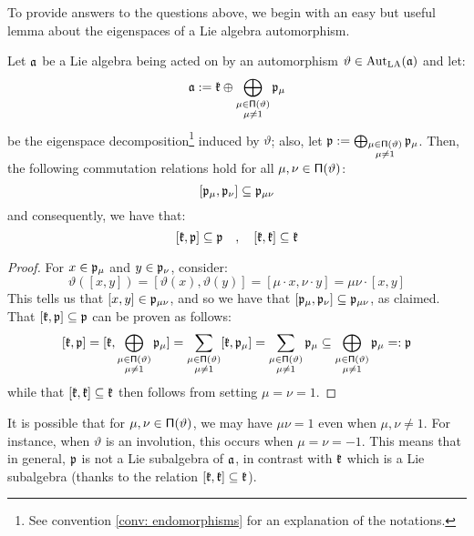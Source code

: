         To provide answers to the questions above, we begin with an easy but useful lemma about the eigenspaces of a Lie algebra automorphism.
        \begin{lemma} \label{lemma: symmetric_space_decompositions}
            Let $\mathfrak{a}$ be a Lie algebra being acted on by an automorphism $\vartheta \in \operatorname{Aut}_{\mathrm{LA}}(\mathfrak{a})$ and let:
                $$\mathfrak{a} := \mathfrak{k} \oplus \bigoplus_{ \substack{\mu \in \mathsf{\Pi}(\vartheta) \\ \mu \not = 1} } \mathfrak{p}_{\mu}$$
            be the eigenspace decomposition\footnote{See convention \ref{conv: endomorphisms} for an explanation of the notations.} induced by $\vartheta$; also, let $\mathfrak{p} := \bigoplus_{ \substack{\mu \in \mathsf{\Pi}(\vartheta) \\ \mu \not = 1} } \mathfrak{p}_{\mu}$. Then, the following commutation relations hold for all $\mu, \nu \in \mathsf{\Pi}(\vartheta)$:
                \begin{equation} \label{equation: symmetric_space_relations}
                    [\mathfrak{p}_{\mu}, \mathfrak{p}_{\nu}] \subseteq \mathfrak{p}_{\mu \nu}
                \end{equation}
            and consequently, we have that:
                $$[\mathfrak{k}, \mathfrak{p}] \subseteq \mathfrak{p} \quad, \quad [\mathfrak{k}, \mathfrak{k}] \subseteq \mathfrak{k}$$
        \end{lemma}
            \begin{proof}
                For $x \in \mathfrak{p}_{\mu}$ and $y \in \mathfrak{p}_{\nu}$, consider:
                    $$\vartheta( [x, y] ) = [ \vartheta(x), \vartheta(y) ] = [\mu \cdot x, \nu \cdot y] = \mu \nu \cdot [x, y]$$
                This tells us that $[x, y] \in \mathfrak{p}_{\mu \nu}$, and so we have that $[\mathfrak{p}_{\mu}, \mathfrak{p}_{\nu}] \subseteq \mathfrak{p}_{\mu \nu}$, as claimed. That $[\mathfrak{k}, \mathfrak{p}] \subseteq \mathfrak{p}$ can be proven as follows:
                    $$[\mathfrak{k}, \mathfrak{p}] = [ \mathfrak{k}, \bigoplus_{ \substack{\mu \in \mathsf{\Pi}(\vartheta) \\ \mu \not = 1} } \mathfrak{p}_{\mu} ] = \sum_{ \substack{\mu \in \mathsf{\Pi}(\vartheta) \\ \mu \not = 1} } [\mathfrak{k}, \mathfrak{p}_{\mu}] = \sum_{ \substack{\mu \in \mathsf{\Pi}(\vartheta) \\ \mu \not = 1} } \mathfrak{p}_{\mu} \subseteq \bigoplus_{ \substack{\mu \in \mathsf{\Pi}(\vartheta) \\ \mu \not = 1} } \mathfrak{p}_{\mu} =: \mathfrak{p}$$
                while that $[\mathfrak{k}, \mathfrak{k}] \subseteq \mathfrak{k}$ then follows from setting $\mu = \nu = 1$.
            \end{proof}
        \begin{remark}
            It is possible that for $\mu, \nu \in \mathsf{\Pi}(\vartheta)$, we may have $\mu \nu = 1$ even when $\mu, \nu \not = 1$. For instance, when $\vartheta$ is an involution, this occurs when $\mu = \nu = -1$. This means that in general, $\mathfrak{p}$ is not a Lie subalgebra of $\mathfrak{a}$, in contrast with $\mathfrak{k}$ which is a Lie subalgebra (thanks to the relation $[\mathfrak{k}, \mathfrak{k}] \subseteq \mathfrak{k}$).
        \end{remark}
        
